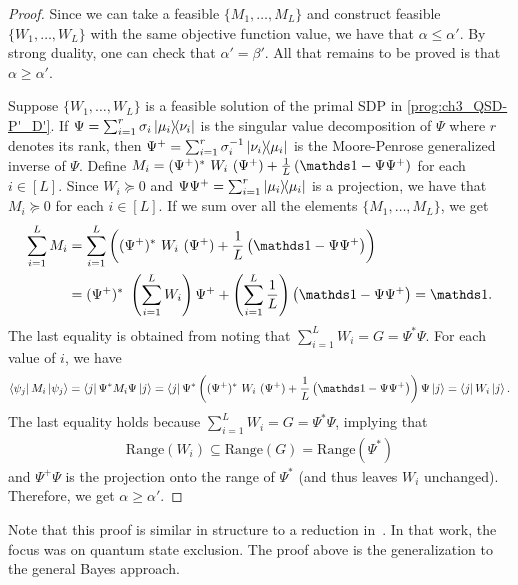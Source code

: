 \begin{proof}
Since we can take a feasible $\{ M_1, \ldots, M_L \}$ and construct feasible $\{ W_1, \ldots, W_L \}$ with the same objective function value, we have that $\alpha \leq \alpha'$.
By strong duality, one can check that $\alpha' = \beta'$.
All that remains to be proved is that $\alpha \geq \alpha'$.

Suppose $\{ W_1, \dots, W_L \}$ is a feasible solution of the primal SDP in \eqref{prog:ch3_QSD-P'_D'}.
If $\Psi = \sum_{i=1}^r \sigma_i \ketbra{\mu_i}{\nu_i}$ is the singular value decomposition of $\Psi$ where $r$ denotes its rank, then $\Psi^+ = \sum_{i=1}^r \sigma_i^{-1} \ketbra{\nu_i}{\mu_i}$ is the Moore-Penrose generalized inverse of $\Psi$.
Define $M_i = (\Psi^+)^*\ W_i\ (\Psi^+) + \frac{1}{L} \left( \id - \Psi \Psi^+ \right)$ for each $i \in [L]$.
Since $W_i \succcurlyeq 0$ and $\Psi \Psi^+ = \sum_{i=1}^r \ketbra{\mu_i}$ is a projection, we have that $M_i \succcurlyeq 0$ for each $i \in [L]$.
If we sum over all the elements $\{ M_1, \dots, M_L \}$, we get
\begin{align}
    \sum_{i=1}^L M_i 
    &= \sum_{i=1}^L \left( (\Psi^+)^*\ W_i\ (\Psi^+) + \frac{1}{L} \left( \id - \Psi \Psi^+ \right) \right) \nonumber \\
    &= (\Psi^+)^*\ \left( \sum_{i=1}^L W_i \right) \Psi^+ + \left( \sum_{i=1}^L \frac{1}{L} \right) \left( \id - \Psi \Psi^+ \right) = \id.
\end{align}
The last equality is obtained from noting that $\sum_{i=1}^L W_i = G = \Psi^* \Psi$.
For each value of $i$, we have 
\begin{align}
    \bra{\psi_j} M_i \ket{\psi_j}
    = \bra{j} \Psi^* M_i \Psi \ket{j}
    = \bra{j} \Psi^* \left( (\Psi^+)^*\ W_i\ (\Psi^+) + \frac{1}{L} \left( \id - \Psi \Psi^+ \right) \right) \Psi \ket{j}
    = \bra{j} W_i \ket{j}.
\end{align} 
The last equality holds because $\sum_{i=1}^L W_i = G = \Psi^* \Psi$, implying that
\begin{align}
    \text{Range}(W_i) \subseteq \text{Range}(G) = \text{Range}(\Psi^*)    
\end{align}
and $\Psi^+ \Psi$ is the projection onto the range of $\Psi^*$ (and thus leaves $W_i$ unchanged).
Therefore, we get $\alpha \ge \alpha'$.

\end{proof}

Note that this proof is similar in structure to a reduction in~\cite{johnston2023tight}.
In that work, the focus was on quantum state exclusion.
The proof above is the generalization to the general Bayes approach.

